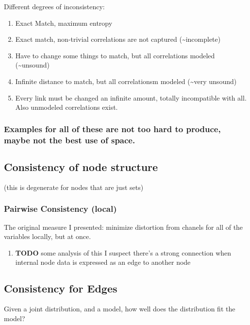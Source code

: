\documentclass[11pt]{article}
\begin{document}
Different degrees of inconsistency:

\begin{enumerate}
\item Exact Match, maximum entropy
\item Exact match, non-trivial correlations are not captured (\textasciitilde{}incomplete)
\item Have to change some things to match, but all correlations modeled (\textasciitilde{}unsound)
\item Infinite distance to match, but all correlationsm modeled (\textasciitilde{}very unsound)
\item Every link must be changed an infinite amount, totally incompatible with all. Also unmodeled correlations exist.
\end{enumerate}

\subsubsection{Examples for all of these are not too hard to produce, maybe not the best use of space.}
\label{sec:org662bb04}

\subsection{Consistency of node structure}
\label{sec:orga530a3b}
(this is degenerate for nodes that are just sets)

\subsubsection{Pairwise Consistency (local)}
\label{sec:org43131b8}
The original measure I presented: minimize distortion from chanels for all of the variables locally, but at once. 

\begin{enumerate}
\item {\bfseries\sffamily TODO} some analysis of this
\label{sec:org4a5f13d}
I suspect there's a strong connection when internal node data is expressed as an edge to another node
\end{enumerate}

\subsection{Consistency for Edges}
\label{sec:org5c73b11}
Given a joint distribution, and a model, how well does the distribution fit the model?
\end{document}
